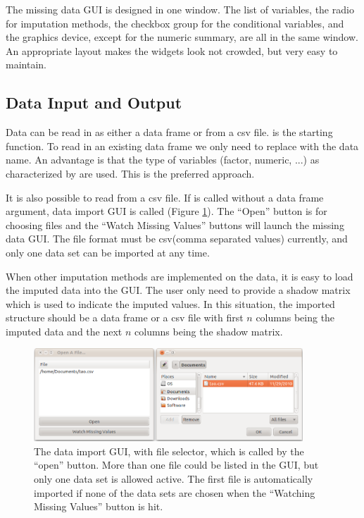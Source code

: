 \documentclass[article]{jss}
\begin{document}
The missing data GUI is designed in one window. The list of variables, the radio for imputation methods, the checkbox group for the conditional variables, and the graphics device, except for the numeric summary, are all in the same window. An appropriate layout makes the widgets look not crowded, but very easy to maintain. 


\subsection{Data Input and Output}

Data can be read in as either a data frame or from a csv file.  is the starting function. To read in an existing data frame we only need to replace  with the data name. An advantage is that the type of variables (factor, numeric, ...) as characterized by  are used. This is the preferred approach.

It is also possible to read from a csv file.  If  is called without a data frame argument, data import GUI is called (Figure \ref{fig: import}).  The ``Open'' button is for choosing files and the ``Watch Missing Values'' buttons will launch the missing data GUI. The file format must be csv(comma separated values) currently, and only one data set can be imported at any time.

When other imputation methods are implemented on the data, it is easy to load the imputed data into the GUI. The user only need to provide a shadow matrix which is used to indicate the imputed values. In this situation, the imported structure should be a data frame or a csv file with first $n$ columns being the imputed data and the next $n$ columns being the shadow matrix.

\begin{center}
\begin{figure}[h]
\begin{centering}
\includegraphics[width=0.9\textwidth]{fig6}
\par\end{centering}
\caption{The data import GUI, with file selector, which is called by the ``open'' button. More than one file could be listed in the GUI, but only one data set is allowed active. The first file is automatically imported if none of the data sets are chosen when the ``Watching Missing Values'' button is hit. }
\label{fig: import}
\end{figure}
\par\end{center}
\end{document}
